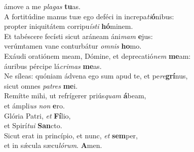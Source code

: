 \oddverse ámove a me \textit{pla}\textit{gas} \textbf{tu}as.\\
\evenverse A fortitúdine manus tuæ ego deféci in increpa\textit{ti}\textbf{ó}nibus:~\*\\
\evenverse propter iniquitátem corripu\textit{í}\textit{sti} \textbf{hó}minem.\\
\oddverse Et tabéscere fecísti sicut aráneam áni\textit{mam} \textbf{e}jus:~\*\\
\oddverse verúmtamen vane conturbátur \textit{om}\textit{nis} \textbf{ho}mo.\\
\evenverse Exáudi oratiónem meam, Dómine, et deprecatió\textit{nem} \textbf{me}am:~\*\\
\evenverse áuribus pércipe lá\textit{cri}\textit{mas} \textbf{me}as.\\
\oddverse Ne síleas: quóniam ádvena ego sum apud te, et pe\textit{re}\textbf{grí}nus,~\*\\
\oddverse sicut omnes \textit{pa}\textit{tres} \textbf{me}i.\\
\evenverse Remítte mihi, ut refrígerer priús\textit{quam} \textbf{á}beam,~\*\\
\evenverse et ámpli\textit{us} \textit{non} \textbf{e}ro.\\
\oddverse Glória Patri, \textit{et} \textbf{Fí}lio,~\*\\
\oddverse et Spirí\textit{tu}\textit{i} \textbf{San}cto.\\
\evenverse Sicut erat in princípio, et nunc, \textit{et} \textbf{sem}per,~\*\\
\evenverse et in sǽcula sæcu\textit{ló}\textit{rum}. \textbf{A}men.\\
